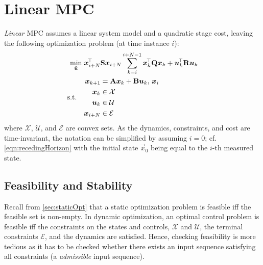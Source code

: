 	\section{Linear MPC}
		\emph{Linear} MPC assumes a linear system model and a quadratic stage cost, leaving the following optimization problem (at time instance \(i\)):
		\begin{equation}
			\begin{aligned}
				\min_{\tilde{\bm{u}}}\; & \bm{x}_{i + N}^{\!\top} \bm{\mathrm{S}} \bm{x}_{i + N} \sum_{k = i}^{i + N - 1} \bm{x}_k^{\!\top} \bm{\mathrm{Q}} \bm{x}_k + \bm{u}_k^{\!\top} \bm{\mathrm{R}} \bm{u}_k \\
				\text{s.t.}\quad &
					\begin{aligned}
						\bm{x}_{k + 1} &= \bm{\mathrm{A}} \bm{x}_k + \bm{\mathrm{B}} \bm{u}_k,\, \bm{x}_i \\
						\bm{x}_k &\in \mathcal{X} \\
						\bm{u}_k &\in \mathcal{U} \\
						\bm{x}_{i + N} &\in \mathcal{E}
					\end{aligned}
			\end{aligned}
			\label{eqn:linearRecedingHorizon}
		\end{equation}
		where \(\mathcal{X}\), \(\mathcal{U}\), and \(\mathcal{E}\) are convex sets. As the dynamics, constraints, and cost are time-invariant, the notation can be simplified by assuming \(i = 0\); cf. \eqref{eqn:recedingHorizon} with the initial state \(\vec{x}_0\) being equal to the \(i\)-th measured state.

		\subsection{Feasibility and Stability}
			Recall from \autoref{sec:staticOpt} that a static optimization problem is feasible iff the feasible set is non-empty. In dynamic optimization, an optimal control problem is feasible iff the constraints on the states and controls, \(\mathcal{X}\) and \(\mathcal{U}\), the terminal constraints \(\mathcal{E}\), and the dynamics are satisfied. Hence, checking feasibility is more tedious as it has to be checked whether there exists an input sequence satisfying all constraints (a \emph{admissible} input sequence).

